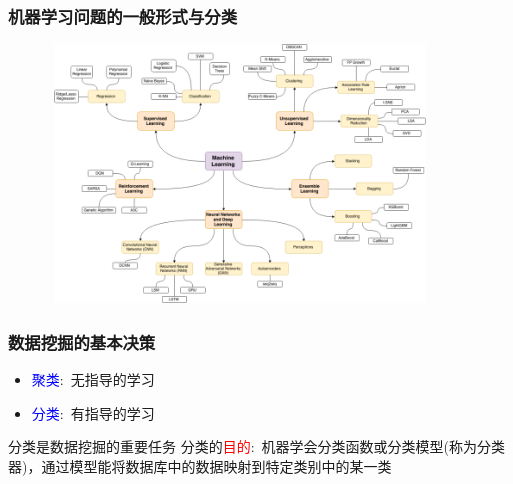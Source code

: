 \frame
{
	\frametitle{机器学习问题的一般形式与分类}
\begin{figure}[h!]
\centering
\vspace*{-7pt}
\includegraphics[height=2.7in,width=4.0in,viewport=0 0 875 620,clip]{Figures/ML_class.png}
\label{ML_classification}
\end{figure}
}

\frame
{
	\frametitle{数据挖掘的基本决策}
\begin{itemize}
	\item \textcolor{blue}{聚类}:~无指导的学习
	\item \textcolor{blue}{分类}:~有指导的学习
\end{itemize}
分类是数据挖掘的重要任务
\vskip 2pt
分类的\textcolor{red}{目的}:~机器学会分类函数或分类模型(称为分类器)，通过模型能将数据库中的数据映射到特定类别中的某一类

\begin{figure}[h!]
\centering
\vspace*{-7pt}
\label{ML_classification-animate}
\end{figure}
}

